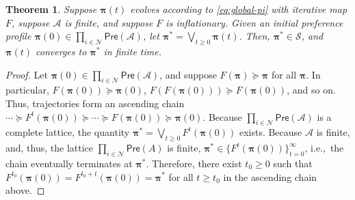 \documentclass[conference]{ieeeconf}
\renewcommand{\succeq}{\succcurlyeq}
\newcommand{\N}{\mathcal{N}}
\newcommand{\A}{\mathcal{A}}
\renewcommand{\SS}{\mathcal{S}}
\newcommand{\Pref}{\mathsf{Pre}}
\newcommand{\profile}{\boldsymbol{\pi}}
\newcommand{\bigjoin}{\bigvee}
\renewcommand{\geq}{\geqslant}
\newtheorem{theorem}{Theorem}
\begin{document}
\begin{theorem} \label{theorem:constructive}
    Suppose $\profile(t)$ evolves according to \eqref{eq:global-pi} with iterative map $F$, suppose $\A$ is finite, and suppose $F$ is inflationary. Given an initial preference profile $\profile(0) \in \prod_{i \in \N} \Pref(\A)$, let $\profile^{\ast} = \bigjoin_{t \geq 0} \profile(t)$. Then, $\profile^{\ast} \in \SS$, and $\profile(t)$ converges to $\profile^{\ast}$ in finite time.
\end{theorem}
\begin{proof}
    Let $\profile(0) \in \prod_{i \in \N} \Pref(\A)$, and suppose $F(\profile) \succeq \profile$ for all $\profile$. In particular, $F\left( \profile(0) \right) \succeq \profile(0)$, $F \left( F\left( \profile(0) \right)\right) \succeq F\left( \profile(0) \right)$, and so on. Thus, trajectories form an ascending chain $\cdots  \succeq F^t\left( \profile(0) \right) \succeq \cdots \succeq F\left( \profile(0) \right) \succeq \profile(0)$.
    Because $\prod_{i \in \N} \Pref(\A)$ is a complete lattice, the quantity $\profile^{\ast} = \bigjoin_{t \geq 0} F^t\left( \profile(0) \right)$
    exists. Because $\A$ is finite, and, thus, the lattice $\prod_{i \in \N} \Pref(A)$ is finite, $\profile^{\ast} \in \{F^t\left(\profile(0) \right)\}_{t=0}^{\infty}$, i.e.,~the chain eventually terminates at $\profile^{\ast}$. Therefore, there exist $t_0 \geq 0$ such that $F^{t_0}\left(\profile(0) \right) = F^{t_0 +t}\left(\profile(0) \right) = \profile^{\ast}$ for all $t \geq t_0$ in the ascending chain above.
\end{proof}
\end{document}

